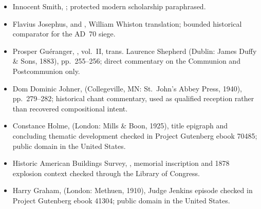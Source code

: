 \begin{deepstudy}
{\begin{itemize}[itemsep=0em,topsep=0.15em,parsep=0pt]
\item Innocent Smith, ; protected modern scholarship paraphrased.
\item Flavius Josephus,  and , William Whiston translation; bounded historical comparator for the AD~70 siege.
\item Prosper Guéranger, , vol.~II, trans. Laurence Shepherd (Dublin: James Duffy \& Sons, 1883), pp.~255--256; direct commentary on the Communion and Postcommunion only.
\item Dom Dominic Johner,  (Collegeville, MN: St.~John's Abbey Press, 1940), pp.~279--282; historical chant commentary, used as qualified reception rather than recovered compositional intent.
\item Constance Holme,  (London: Mills \& Boon, 1925), title epigraph and concluding thematic development checked in Project Gutenberg ebook 70485; public domain in the United States.
\item Historic American Buildings Survey, , memorial inscription and 1878 explosion context checked through the Library of Congress.
\item Harry Graham,  (London: Methuen, 1910), Judge Jenkins episode checked in Project Gutenberg ebook 41304; public domain in the United States.
\end{itemize}
}

\enlargethispage{3\baselineskip}
\par\vspace{0pt}
\vspace{0pt}
{\fontsize{6.9}{7.3}\selectfont
\setlength{\parskip}{0pt}

}

\end{deepstudy}

